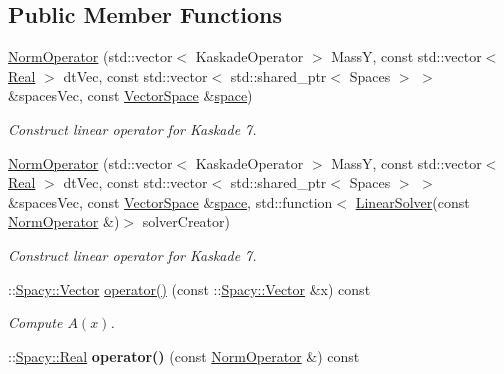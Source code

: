 \subsection*{Public Member Functions}
\begin{DoxyCompactItemize}
\item 
\hyperlink{classSpacy_1_1KaskadeParabolic_1_1PDE_1_1NormOperator_aa8854e2d40ad5f4ec0f2e3c1e30ff869}{Norm\-Operator} (std\-::vector$<$ Kaskade\-Operator $>$ Mass\-Y, const std\-::vector$<$ \hyperlink{classSpacy_1_1Real}{Real} $>$ dt\-Vec, const std\-::vector$<$ std\-::shared\-\_\-ptr$<$ Spaces $>$ $>$ \&spaces\-Vec, const \hyperlink{classSpacy_1_1VectorSpace}{Vector\-Space} \&\hyperlink{classSpacy_1_1VectorBase_aa999dbf9d679d895dfe04c10fbf9f5e9}{space})
\begin{DoxyCompactList}\small\item\em Construct linear operator for Kaskade 7. \end{DoxyCompactList}\item 
\hyperlink{classSpacy_1_1KaskadeParabolic_1_1PDE_1_1NormOperator_a5180c5f174240902b0e92a9a09bb183d}{Norm\-Operator} (std\-::vector$<$ Kaskade\-Operator $>$ Mass\-Y, const std\-::vector$<$ \hyperlink{classSpacy_1_1Real}{Real} $>$ dt\-Vec, const std\-::vector$<$ std\-::shared\-\_\-ptr$<$ Spaces $>$ $>$ \&spaces\-Vec, const \hyperlink{classSpacy_1_1VectorSpace}{Vector\-Space} \&\hyperlink{classSpacy_1_1VectorBase_aa999dbf9d679d895dfe04c10fbf9f5e9}{space}, std\-::function$<$ \hyperlink{namespaceSpacy_adcd0d78166a9c972b8a2e5a689fc2d03}{Linear\-Solver}(const \hyperlink{classSpacy_1_1KaskadeParabolic_1_1PDE_1_1NormOperator}{Norm\-Operator} \&)$>$ solver\-Creator)
\begin{DoxyCompactList}\small\item\em Construct linear operator for Kaskade 7. \end{DoxyCompactList}\item 
\-::\hyperlink{classSpacy_1_1Vector}{Spacy\-::\-Vector} \hyperlink{classSpacy_1_1KaskadeParabolic_1_1PDE_1_1NormOperator_a9e279407787ec6ecdeac630f33cc38ab}{operator()} (const \-::\hyperlink{classSpacy_1_1Vector}{Spacy\-::\-Vector} \&x) const 
\begin{DoxyCompactList}\small\item\em Compute $A(x)$. \end{DoxyCompactList}\item 
\hypertarget{classSpacy_1_1KaskadeParabolic_1_1PDE_1_1NormOperator_aa6a2661694410abadae24dd67fcb7831}{\-::\hyperlink{classSpacy_1_1Real}{Spacy\-::\-Real} {\bfseries operator()} (const \hyperlink{classSpacy_1_1KaskadeParabolic_1_1PDE_1_1NormOperator}{Norm\-Operator} \&) const }\label{classSpacy_1_1KaskadeParabolic_1_1PDE_1_1NormOperator_aa6a2661694410abadae24dd67fcb7831}


\end{DoxyCompactItemize}
